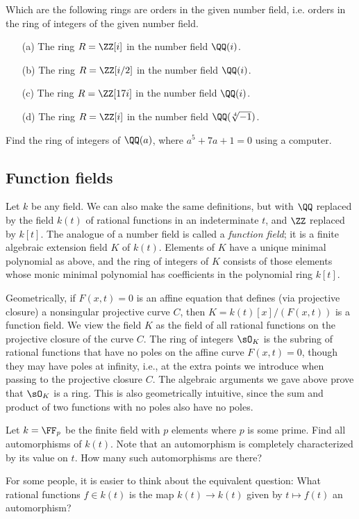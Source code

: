 \begin{exercise}
  Which are the following rings are orders in the given
  number field, i.e. orders in the ring of integers of the
  given number field.
  \begin{enumerate}
    \item[(a)] The ring $R = \ZZ[i]$ in the number field $\QQ(i)$.
    \item[(b)] The ring $R = \ZZ[i/2]$ in the number field $\QQ(i)$.
    \item[(c)] The ring $R = \ZZ[17i]$ in the number field $\QQ(i)$.
    \item[(d)] The ring $R = \ZZ[i]$ in the number field $\QQ(\sqrt[4]{-1})$.
  \end{enumerate}
\end{exercise}

\begin{exercise}
  Find the ring of integers of $\QQ(a)$, where $a^5 + 7a + 1 = 0$
  using a computer.
\end{exercise}

\subsection{Function fields}
Let $k$ be any field.  We can also make the same definitions, but with $\QQ$
replaced by the field $k(t)$ of rational functions in an indeterminate
$t$, and $\ZZ$ replaced by $k[t]$.
The analogue of a number field is called a {\em function field}; it is
a finite algebraic extension field $K$ of $k(t)$.  Elements of $K$
have a unique minimal polynomial as above, and the ring of integers of
$K$ consists of those elements whose monic minimal polynomial has
coefficients in the polynomial ring $k[t]$.

Geometrically, if $F(x,t)=0$ is an affine equation that defines (via
projective closure) a nonsingular projective curve $C$, then
$K=k(t)[x]/(F(x,t))$ is a function field.  We view the field $K$ as
the field of all rational functions on the projective closure of the
curve $C$.  The ring of integers $\sO_K$ is the subring of rational
functions that have no poles on the affine curve $F(x,t)=0$, though
they may have poles at infinity, i.e., at the extra points we
introduce when passing to the projective closure $C$.  The algebraic
arguments we gave above prove that $\sO_K$ is a ring.  This is also
geometrically intuitive, since the sum and product of two functions
with no poles also have no poles.

\begin{exercise}
  Let $k = \FF_p$ be the finite field with $p$ elements where $p$ is some prime. Find all automorphisms of $k(t)$. Note that an automorphism is completely characterized by its value on $t$. How many such automorphisms are there?

  \begin{hint}
    For some people, it is easier to think about the equivalent question: What rational functions $f\in k(t)$ is the map $k(t)\to k(t)$ given by $t\mapsto f(t)$ an automorphism?
  \end{hint}
\end{exercise}

